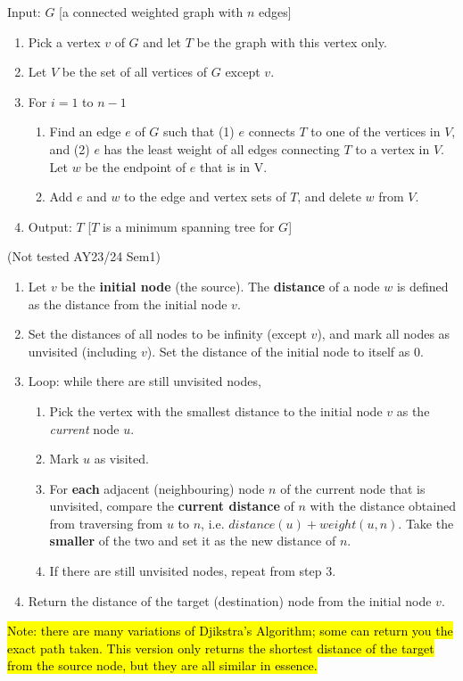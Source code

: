 \documentclass{article}
\begin{document}
\begin{description}
\begin{enumerate}
    \end{enumerate}
    \item[\ding{73} Prim's Algorithm for MST] Input: $G$ [a connected weighted graph with $n$ edges]
    \begin{enumerate}
    	\item Pick a vertex $v$ of $G$ and let $T$ be the graph with this vertex only.
		\item Let $V$ be the set of all vertices of $G$ except $v$.
		\item For $i = 1$ to $n - 1$
		\begin{enumerate}
			\item Find an edge $e$ of $G$ such that (1) $e$ connects $T$ to one of the vertices in $V$, and (2) $e$ has the least weight of all edges connecting $T$ to a vertex in $V$. Let $w$ be the endpoint of $e$ that is in V.
			\item Add $e$ and $w$ to the edge and vertex sets of $T$, and delete $w$ from $V$.
		\end{enumerate}
		\item Output: $T$ [$T$ is a minimum spanning tree for $G$]
    \end{enumerate}
    \item[Djikstra's Algorithm for shortest path] (Not tested AY23/24 Sem1) 
    \begin{enumerate}
    	\item Let $v$ be the \textbf{initial node} (the source). The \textbf{distance} of a node $w$ is defined as the distance from the initial node $v$. 
		\item Set the distances of all nodes to be infinity (except $v$), and mark all nodes as unvisited (including $v$). Set the distance of the initial node to itself as 0. 
		\item Loop: while there are still unvisited nodes, 
		\begin{enumerate}
			\item Pick the vertex with the smallest distance to the initial node $v$ as the \emph{current} node $u$. 
			\item Mark $u$ as visited. 
			\item For \textbf{each} adjacent (neighbouring) node $n$ of the current node that is unvisited, compare the \textbf{current distance} of $n$ with the distance obtained from traversing from $u$ to $n$, i.e. $distance(u) + weight(u, n)$. Take the \textbf{smaller} of the two and set it as the new distance of $n$. 
			\item If there are still unvisited nodes, repeat from step 3. 
		\end{enumerate} 
		\item Return the distance of the target (destination) node from the initial node $v$.
    \end{enumerate}
    \item \hl{Note: there are many variations of Djikstra's Algorithm; some can return you the exact path taken. This version only returns the shortest distance of the target from the source node, but they are all similar in essence.}
    

\end{description}
\end{document}
